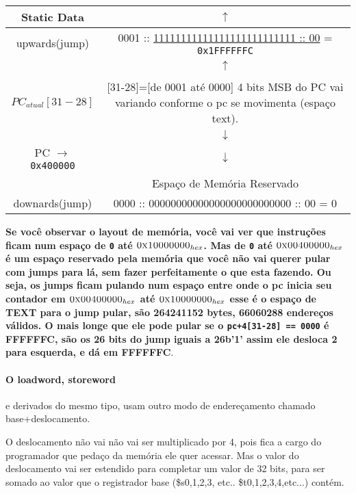\documentclass{article}
\begin{document}
\begin{table}[ht!]
\begin{tabular}{|c|c|}
\hline  Static Data & $\uparrow$ \\
\hline upwards(jump) & 0001 :: \underline{11111111111111111111111111 :: 00} = 
\verb|0x1FFFFFFC| \\ 
\hline  & $\uparrow$ \\
\hline  & \\
\hline $PC_{atual}[31-28]$ & [31-28]=[de 0001 até 0000] \tiny{4 bits MSB do PC} 
vai variando conforme o pc se movimenta (espaço text).
\\
\hline  & $\downarrow$ \\
\hline PC $\rightarrow$ \verb|0x400000| & $\downarrow$ \\
\hline  & Espaço de Memória Reservado \\
\hline downards(jump) & 0000 :: 00000000000000000000000000 :: 00 = 0 \\ 
\hline
\end{tabular}
\end{table}

{\color{Red} \bfseries Se você observar o layout de memória, você vai ver que
instruções ficam num espaço de \verb|0| até $\textsc{0x10000000}_{hex}$. Mas de
\verb|0| até $\textsc{0x00400000}_{hex}$ é um espaço reservado pela memória que
você não vai querer pular com jumps para lá, sem fazer perfeitamente o que esta
fazendo. Ou seja, os jumps ficam pulando num espaço entre onde o pc inicia seu
contador em $\textsc{0x00400000}_{hex}$ até $\textsc{0x10000000}_{hex}$ esse é 
o espaço de \textsc{TEXT} para o jump pular, são 264241152 bytes, 66060288 
endereços válidos. O mais longe que ele pode pular se o
\verb|pc+4[31-28] == 0000| é FFFFFFC, são os 26 bits do jump iguais a 26{b'1'}
assim ele desloca 2 para esquerda, e dá em FFFFFFC}.

\pagebreak
\paragraph{O loadword, storeword} e derivados do mesmo tipo, usam outro modo de 
endereçamento chamado base+deslocamento.

O deslocamento não vai não vai ser multiplicado por 4, pois fica a cargo do 
programador que pedaço da memória ele quer acessar. Mas o valor do deslocamento
vai ser estendido para completar um valor de 32 bits, para ser somado ao valor 
que o registrador base (\$s0,1,2,3, etc.. \$t0,1,2,3,4,etc...) contém.
\end{document}
